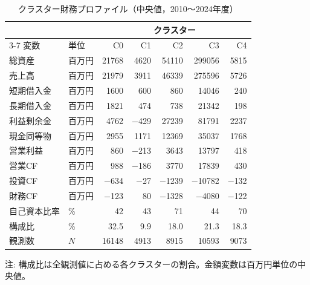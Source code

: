\begin{table}[htbp]
  \centering
  \caption{クラスター財務プロファイル（中央値，2010〜2024年度）}
  \label{tab:cluster-profile}
  \small
  \begin{tabular}{llrrrrr}
    \toprule
    & & \multicolumn{5}{c}{クラスター} \\
    \cmidrule(lr){3-7}
    変数 & 単位 & C0 & C1 & C2 & C3 & C4 \\
    \midrule
    総資産       & 百万円 & \num{21768} & \num{4620}  & \num{54110}  & \num{299056} & \num{5815} \\
    売上高       & 百万円 & \num{21979} & \num{3911}  & \num{46339}  & \num{275596} & \num{5726} \\
    短期借入金   & 百万円 & \num{1600}  & \num{600}   & \num{860}    & \num{14046}  & \num{240} \\
    長期借入金   & 百万円 & \num{1821}  & \num{474}   & \num{738}    & \num{21342}  & \num{198} \\
    利益剰余金   & 百万円 & \num{4762}  & $-$\num{429}& \num{27239}  & \num{81791}  & \num{2237} \\
    現金同等物   & 百万円 & \num{2955}  & \num{1171}  & \num{12369}  & \num{35037}  & \num{1768} \\
    営業利益     & 百万円 & \num{860}   & $-$\num{213}& \num{3643}   & \num{13797}  & \num{418} \\
    営業CF       & 百万円 & \num{988}   & $-$\num{186}& \num{3770}   & \num{17839}  & \num{430} \\
    投資CF       & 百万円 & $-$\num{634}& $-$\num{27} & $-$\num{1239}& $-$\num{10782}& $-$\num{132} \\
    財務CF       & 百万円 & $-$\num{123}& \num{80}    & $-$\num{1328}& $-$\num{4080}& $-$\num{122} \\
    自己資本比率 & \%     & 42          & 43           & 71           & 44           & 70 \\
    \midrule
    構成比       & \%     & 32.5        & 9.9          & 18.0         & 21.3         & 18.3 \\
    観測数       & $N$    & \num{16148} & \num{4913}   & \num{8915}   & \num{10593}  & \num{9073} \\
    \bottomrule
  \end{tabular}
  \begin{tablenotes}
    \small
    \item 注: 構成比は全観測値に占める各クラスターの割合。金額変数は百万円単位の中央値。
  \end{tablenotes}
\end{table}

